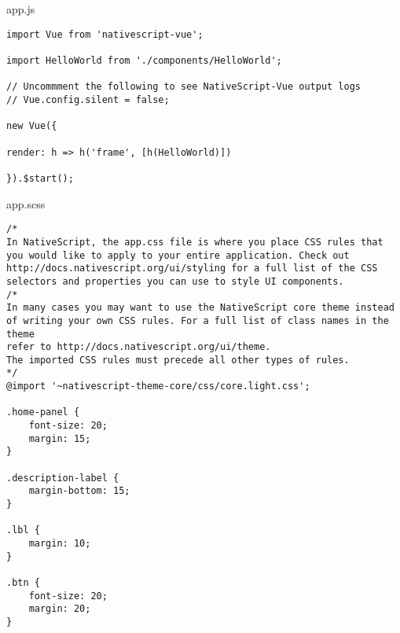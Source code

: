 \chapter{}
\label{ch:broncode_app}
app.js
\begin{lstlisting}
import Vue from 'nativescript-vue';

import HelloWorld from './components/HelloWorld';

// Uncommment the following to see NativeScript-Vue output logs
// Vue.config.silent = false;

new Vue({

render: h => h('frame', [h(HelloWorld)])

}).$start();
\end{lstlisting}
app.scss
\begin{lstlisting}
/*
In NativeScript, the app.css file is where you place CSS rules that
you would like to apply to your entire application. Check out
http://docs.nativescript.org/ui/styling for a full list of the CSS
selectors and properties you can use to style UI components.
/*
In many cases you may want to use the NativeScript core theme instead
of writing your own CSS rules. For a full list of class names in the theme
refer to http://docs.nativescript.org/ui/theme.
The imported CSS rules must precede all other types of rules.
*/
@import '~nativescript-theme-core/css/core.light.css';

.home-panel {
	font-size: 20;
	margin: 15;
}

.description-label {
	margin-bottom: 15;
}

.lbl {
	margin: 10;
}

.btn {
	font-size: 20;
	margin: 20;
}
\end{lstlisting}
